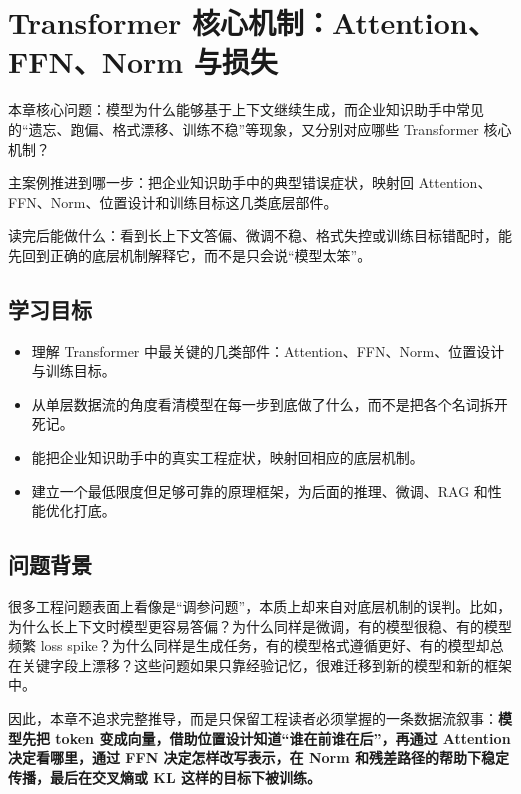\chapter{Transformer 核心机制：Attention、FFN、Norm 与损失}

\begin{introduction}
\item {\heiti 本章核心问题}：模型为什么能够基于上下文继续生成，而企业知识助手中常见的“遗忘、跑偏、格式漂移、训练不稳”等现象，又分别对应哪些 Transformer 核心机制？
\item {\heiti 主案例推进到哪一步}：把企业知识助手中的典型错误症状，映射回 Attention、FFN、Norm、位置设计和训练目标这几类底层部件。
\item {\heiti 读完后能做什么}：看到长上下文答偏、微调不稳、格式失控或训练目标错配时，能先回到正确的底层机制解释它，而不是只会说“模型太笨”。
\end{introduction}

\section{学习目标}
\begin{itemize}
  \item 理解 Transformer 中最关键的几类部件：Attention、FFN、Norm、位置设计与训练目标。
  \item 从单层数据流的角度看清模型在每一步到底做了什么，而不是把各个名词拆开死记。
  \item 能把企业知识助手中的真实工程症状，映射回相应的底层机制。
  \item 建立一个最低限度但足够可靠的原理框架，为后面的推理、微调、RAG 和性能优化打底。
\end{itemize}

\section{问题背景}
很多工程问题表面上看像是“调参问题”，本质上却来自对底层机制的误判。比如，为什么长上下文时模型更容易答偏？为什么同样是微调，有的模型很稳、有的模型频繁 loss spike？为什么同样是生成任务，有的模型格式遵循更好、有的模型却总在关键字段上漂移？这些问题如果只靠经验记忆，很难迁移到新的模型和新的框架中。

因此，本章不追求完整推导，而是只保留工程读者必须掌握的一条数据流叙事：\textbf{模型先把 token 变成向量，借助位置设计知道“谁在前谁在后”，再通过 Attention 决定看哪里，通过 FFN 决定怎样改写表示，在 Norm 和残差路径的帮助下稳定传播，最后在交叉熵或 KL 这样的目标下被训练。}


